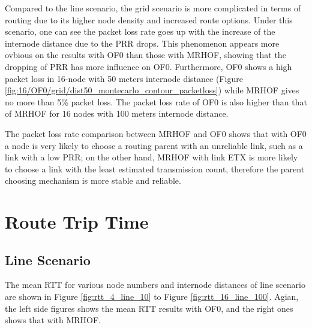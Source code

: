 Compared to the line scenario, the grid scenario is more complicated in terms of routing due to its higher node density and increased route options.  Under this scenario, one can see the packet loss rate goes up with the increase of the internode distance due to the PRR drops. This phenomenon appears more ovbious on the results with OF0 than those with MRHOF, showing that the dropping of PRR has more influence on OF0. Furthermore, OF0 shows a high packet loss in 16-node with 50 meters internode distance (Figure \ref{fig:16/OF0/grid/dist50_montecarlo_contour_packetloss}) while MRHOF gives no more than 5\% packet loss. The packet loss rate of OF0 is also higher than that of MRHOF for 16 nodes with 100 meters internode distance. 
\newline

The packet loss rate comparison between MRHOF and OF0 shows that with OF0 a node is very likely to choose a routing parent with an unreliable link, such as a link with a low PRR; on the other hand, MRHOF with link ETX is more likely to choose a link with the least estimated transmission count, therefore the parent choosing mechanism is more stable and reliable. 

\section{Route Trip Time}
\label{rtt}
 
\subsection{Line Scenario}
\label{line scenario}

The mean RTT for various node numbers and internode distances of line scenario are shown in Figure \ref{fig:rtt_4_line_10} to Figure \ref{fig:rtt_16_line_100}. Agian, the left side figures shows the mean RTT results with OF0, and the right ones shows that with MRHOF.
\newline

